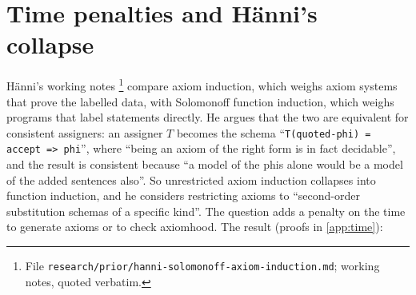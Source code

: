\section{Time penalties and H\"anni's collapse}\label{sec:time}

H\"anni's working notes \citep{hanni2026notes}\footnote{File \texttt{research/prior/hanni-solomonoff-axiom-induction.md}; working notes, quoted verbatim.} compare axiom induction, which weighs axiom systems that prove the labelled data, with Solomonoff function induction, which weighs programs that label statements directly. He argues that the two are equivalent for consistent assigners: an assigner $T$ becomes the schema ``\texttt{T(quoted-phi) = accept => phi}'', where ``being an axiom of the right form is in fact decidable'', and the result is consistent because ``a model of the phis alone would be a model of the added sentences also''. So unrestricted axiom induction collapses into function induction, and he considers restricting axioms to ``second-order substitution schemas of a specific kind''. The question adds a penalty on the time to generate axioms or to check axiomhood. The result (proofs in \cref{app:time}):

